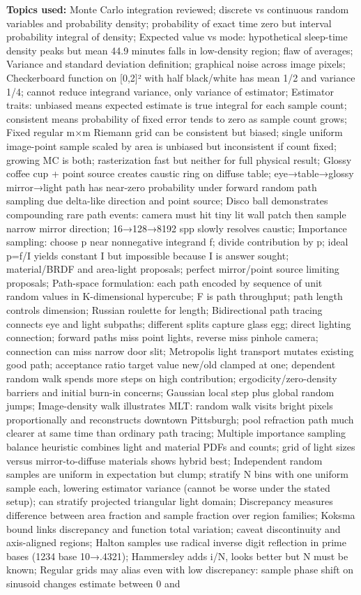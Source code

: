 \textbf{Topics used:} Monte Carlo integration reviewed; discrete vs continuous random variables and probability density; probability of exact time zero but interval probability integral of density; Expected value vs mode: hypothetical sleep-time density peaks but mean 44.9 minutes falls in low-density region; flaw of averages; Variance and standard deviation definition; graphical noise across image pixels; Checkerboard function on {[}0,2{]}² with half black/white has mean 1/2 and variance 1/4; cannot reduce integrand variance, only variance of estimator; Estimator traits: unbiased means expected estimate is true integral for each sample count; consistent means probability of fixed error tends to zero as sample count grows; Fixed regular m×m Riemann grid can be consistent but biased; single uniform image-point sample scaled by area is unbiased but inconsistent if count fixed; growing MC is both; rasterization fast but neither for full physical result; Glossy coffee cup + point source creates caustic ring on diffuse table; eye→table→glossy mirror→light path has near-zero probability under forward random path sampling due delta-like direction and point source; Disco ball demonstrates compounding rare path events: camera must hit tiny lit wall patch then sample narrow mirror direction; 16→128→8192 spp slowly resolves caustic; Importance sampling: choose p near nonnegative integrand f; divide contribution by p; ideal p=f/I yields constant I but impossible because I is answer sought; material/BRDF and area-light proposals; perfect mirror/point source limiting proposals; Path-space formulation: each path encoded by sequence of unit random values in K-dimensional hypercube; F is path throughput; path length controls dimension; Russian roulette for length; Bidirectional path tracing connects eye and light subpaths; different splits capture glass egg; direct lighting connection; forward paths miss point lights, reverse miss pinhole camera; connection can miss narrow door slit; Metropolis light transport mutates existing good path; acceptance ratio target value new/old clamped at one; dependent random walk spends more steps on high contribution; ergodicity/zero-density barriers and initial burn-in concerns; Gaussian local step plus global random jumps; Image-density walk illustrates MLT: random walk visits bright pixels proportionally and reconstructs downtown Pittsburgh; pool refraction path much clearer at same time than ordinary path tracing; Multiple importance sampling balance heuristic combines light and material PDFs and counts; grid of light sizes versus mirror-to-diffuse materials shows hybrid best; Independent random samples are uniform in expectation but clump; stratify N bins with one uniform sample each, lowering estimator variance (cannot be worse under the stated setup); can stratify projected triangular light domain; Discrepancy measures difference between area fraction and sample fraction over region families; Koksma bound links discrepancy and function total variation; caveat discontinuity and axis-aligned regions; Halton samples use radical inverse digit reflection in prime bases (1234 base 10→.4321); Hammersley adds i/N, looks better but N must be known; Regular grids may alias even with low discrepancy: sample phase shift on sinusoid changes estimate between 0 and 